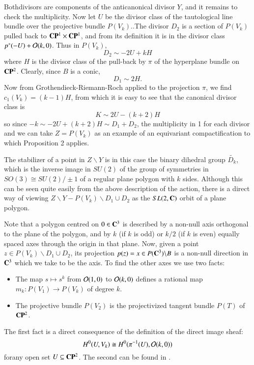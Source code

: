Both\pageoriginale divisors are components of the anticanonical divisor $Y$, and it  remains to check the multiplicity. Now let $U$ be the divisor class of the tautological line bundle over the projective bundle $P(V_{k})$..The divisor $D_{2}$ is a section of $P(V_{k})$ pulled back to $\mathbf{C}\mathbf{P}^{1} \times\mathbf{C}\mathbf{P}^{1}$, and from its definition it is in the divisor class $p^{*}(-U) + \mathcal{O}(k,0)$. Thus in $P(V_{k})$,
\begin{equation*}\label{art7-eq-8}
D_{2}\sim -2U + kH\tag{8}
\end{equation*}
where $H$ is the divisor class of the pull-back by $\pi$ of the hyperplane bundle on $\mathbf{C}\mathbf{P}^{2}$. Clearly, since $B$ is a conic,
\begin{equation*}\label{art7-eq-9}
D_{1} \sim 2H.\tag{9}
\end{equation*}
Now from Grothendieck-Riemann-Roch applied to the projection $\pi$, we find $c_{1}(V_{k})=(k-1)H$, from which it is easy to see that the canonical divisor class is
$$
K\sim 2U -(k+2)H
$$
so since $-k\sim -2U +(k+2)H\sim D_{1} + D_{2}$, the multiplicity in 1 for each divisor and we can take $Z =P(V_{k})$ as an example of an equivariant compactification to which Proposition 2 applies.

The stabilizer of a point in $Z\backslash Y$ is in this case the binary dihedral group $\tilde{D_{k}}$, which is the inverse image in $SU(2)$ of the group of symmetries in $SO(3) \cong SU(2)/\pm 1$ of a regular plane polygon  with $k$ sides. Although this can be seen quite easily from the above description of the action, there is a direct way of viewing $Z\backslash Y - P(V_{k})\backslash D_{1}\cup D_{2}$ as the $SL(2, \mathbf{C})$ orbit of a plane polygon.

Note that a polygon centred on $0 \in \mathbf{C}^{3}$ is described by a non-null axis orthogonal to the plane of the polygon, and by $k$ (if $k$ is odd) or $k/2$ (if $k$ is even) equally spaced axes through the origin in that plane. Now, given a point $z\in P(V_{k})\backslash D_{1}\cup D_{2}$, its projection $p(z)= x \in P(\mathbf{C}^{3})\backslash B$ is a non-null direction in $\mathbf{C}^{3}$ which we take to be the axis. To find the other axes we use two facts: 
\begin{itemize}
\item The map $s \mapsto s^{k}$ from $\mathcal{O}(1,0)$ to $\mathcal{O}(k,0)$ defines a rational map $m_{k} : P(V_{1})\rightarrow P(V_{k})$ of degree $k$.
\item The projective bundle $P(V_{2})$ is the projectivized tangent bundle $P(T)$ of $\mathbf{C}\mathbf{P}^{2}$.
\end{itemize}
The first fact is a direct consequence of the definition of the direct image sheaf:
$$
H^{0}(U, V_{k})\cong H^{0}(\pi^{-1}(U), \mathcal{O}(k,0))
$$
for\pageoriginale any open set $U \subseteq \mathbf{C}\mathbf{P}^{2}$. The second can be found in \cite{art7-key16}.


